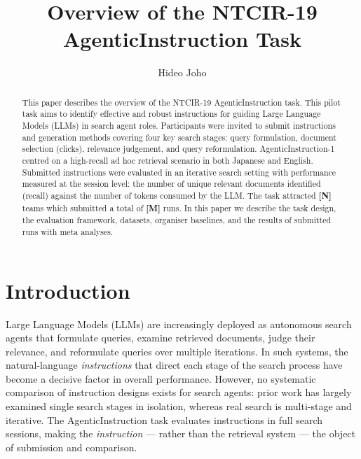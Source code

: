 \documentclass[sigconf,article]{acmart}
\begin{document}
\title{Overview of the NTCIR-19 AgenticInstruction Task}

\author{Hideo Joho}

\begin{abstract}
This paper describes the overview of the NTCIR-19 AgenticInstruction task.
This pilot task aims to identify effective and robust instructions for guiding
Large Language Models (LLMs) in search agent roles. Participants were invited
to submit instructions and generation methods covering four key search stages:
query formulation, document selection (clicks), relevance judgement, and query
reformulation. AgenticInstruction-1 centred on a high-recall ad hoc retrieval
scenario in both Japanese and English. Submitted instructions were evaluated
in an iterative search setting with performance measured at the session level:
the number of unique relevant documents identified (recall) against the number
of tokens consumed by the LLM.
The task attracted \textbf{[N]} teams which submitted a total of
\textbf{[M]} runs. In this paper we describe the task design, the evaluation
framework, datasets, organiser baselines, and the results of submitted runs
with meta analyses.
\end{abstract}


\maketitle

\section{Introduction}

Large Language Models (LLMs) are increasingly deployed as autonomous search
agents that formulate queries, examine retrieved documents, judge their
relevance, and reformulate queries over multiple iterations. In such systems,
the natural-language \emph{instructions} that direct each stage of the search
process have become a decisive factor in overall performance. However, no
systematic comparison of instruction designs exists for search agents: prior
work has largely examined single search stages in isolation, whereas real
search is multi-stage and iterative. The AgenticInstruction task evaluates
instructions in full search sessions, making the \emph{instruction} --- rather
than the retrieval system --- the object of submission and comparison.
\end{document}
